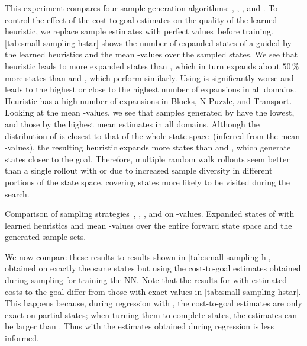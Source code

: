 This experiment compares four sample generation algorithms: \bfs, \dfs, \rw, and \bfsrw. To control the effect of the cost-to-goal estimates on the quality of the learned heuristic, we replace sample estimates with perfect values~\hstar before training. \cref{tab:small-sampling-hstar} shows the number of expanded states of a \gbfs guided by the learned heuristics and the mean \hstar-values over the sampled states. We see that heuristic \hnnl{\bfs} leads to more expanded states than \hnnl{\dfs}, which in turn expands about $50\,\%$ more states than \hnnl{\rw} and \hnnl{\bfsrw}, which perform similarly. Using \hnnl{\bfs} is significantly worse and leads to the highest or close to the highest number of expansions in all domains. Heuristic \hnnl{\dfs} has a high number of expansions in Blocks, N-Puzzle, and Transport. Looking at the mean \hstar-values, we see that samples generated by \bfs have the lowest, and those by \dfs the highest mean estimates in all domains. Although the distribution of \dfs is closest to that of the whole state space~(inferred from the mean \hstar-values), the resulting heuristic expands more states than \rw and \bfsrw, which generate states closer to the goal. Therefore, multiple random walk rollouts seem better than a single rollout with \bfs or \dfs due to increased sample diversity in different portions of the state space, covering states more likely to be visited during the search.

\begin{table}[tb]
    \caption[Comparison of sampling strategies on \hstar-values.]{Comparison of sampling strategies~\bfs, \dfs, \rw, and \bfsrw on \hstar-values. Expanded states of \gbfs with learned heuristics and mean \hstar-values over the entire forward state space and the generated sample sets.}
    \label{tab:small-sampling-hstar}
    \addmargin
    \centering
    
\end{table}

We now compare these results to results shown in \cref{tab:small-sampling-h}, obtained on exactly the same states but using the cost-to-goal estimates obtained during sampling for training the NN. Note that the results for \bfs with estimated costs to the goal differ from those with exact values in \cref{tab:small-sampling-hstar}. This happens because, during regression with \bfs, the cost-to-goal estimates are only exact on partial states; when turning them to complete states, the estimates can be larger than \hstar. Thus \hnnl{\bfs} with the estimates obtained during regression is less informed.


